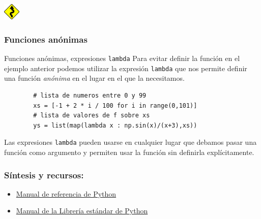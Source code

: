 \documentclass{beamer}
\begin{document}
\begin{frame}[fragile]
    \includegraphics[height=0.8cm, width=0.8cm]{figuras/sin.png}
    \frametitle{Funciones anónimas}
    \begin{block}{Funciones anónimas, expresiones \texttt{lambda}}
    Para evitar definir la función en el ejemplo anterior podemos utilizar la expresión
    \texttt{lambda} que nos permite definir una función {\em anónima} en
    el lugar en el que la necesitamos.
    \begin{verbatim}
        # lista de numeros entre 0 y 99
        xs = [-1 + 2 * i / 100 for i in range(0,101)]
        # lista de valores de f sobre xs
        ys = list(map(lambda x : np.sin(x)/(x+3),xs))
    \end{verbatim}
    Las expresiones \texttt{lambda} pueden usarse en cualquier lugar que debamos pasar 
    una función como argumento y permiten usar la función sin definirla explícitamente.
    \end{block}

\end{frame}

\begin{frame}
\frametitle{Síntesis y recursos:}

\begin{itemize}
    \item \href{https://docs.python.org/3/reference/index.html}{Manual de referencia de Python}
    \item \href{https://docs.python.org/3/library/index.html}{Manual de la Librería estándar de Python}
\end{itemize}
\end{frame}
\end{document}
